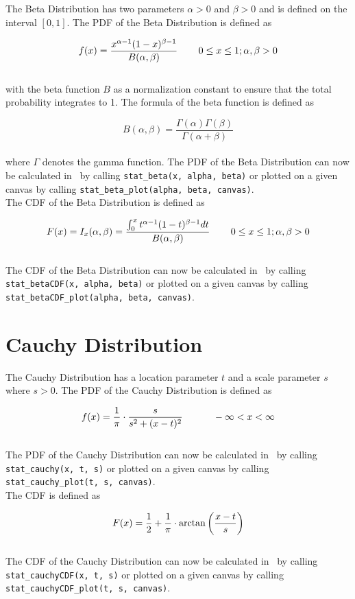 		The Beta Distribution has two parameters $\alpha > 0$ and $\beta > 0$ and is defined on the interval $[0,1]$. The \ac{PDF} of the Beta Distribution is defined as

		$$f(x) = \frac{x^{\alpha-1}(1-x)^{\beta-1}}{B(\alpha,\beta)}  \hspace{.3in} 0 \le x \le 1; \alpha, \beta > 0$$
		\\[0.3cm]		
		with the beta function $B$ as a normalization constant to ensure that the total probability integrates to 1. The formula of the beta function is defined as

		$$B(\alpha,\beta) = \frac{\Gamma(\alpha)\Gamma(\beta)}{\Gamma(\alpha + \beta)}$$
		\\[0.3cm]
		where $\Gamma$ denotes the gamma function. The \ac{PDF} of the Beta Distribution can now be calculated in \setlx\ by calling \lstinline{stat_beta(x, alpha, beta)} or plotted on a given canvas by calling \lstinline{stat_beta_plot(alpha, beta, canvas)}.
		\\[0.3cm]		
		The \ac{CDF} of the Beta Distribution is defined as

		$$F(x) = I_{x}(\alpha,\beta) = \frac{\int_{0}^{x}{t^{\alpha-1}(1-t)^{\beta-1}dt}}{B(\alpha,\beta)} \hspace{.3in} 0 \le x \le 1; \alpha, \beta > 0$$
		\\[0.3cm]
		The \ac{CDF} of the Beta Distribution can now be calculated in \setlx\ by calling \lstinline{stat_betaCDF(x, alpha, beta)} or plotted on a given canvas by calling \lstinline{stat_betaCDF_plot(alpha, beta, canvas)}.


	\section{Cauchy Distribution}

		The Cauchy Distribution has a location parameter $t$ and a scale parameter $s$ where $s > 0$. The \ac{PDF} of the Cauchy Distribution is defined as

		$$\displaystyle f(x) = \frac{1}{\pi} \cdot \frac{s}{s^2 + (x-t)^2} \quad \hspace{.3in} -\infty<x<\infty$$
		\\[0.3cm]
		The \ac{PDF} of the Cauchy Distribution can now be calculated in \setlx\ by calling \lstinline{stat_cauchy(x, t, s)} or plotted on a given canvas by calling \lstinline{stat_cauchy_plot(t, s, canvas)}.
		\\[0.3cm]
		The \ac{CDF} is defined as 

		$$\displaystyle F(x) = \frac{1}{2} + \frac{1}{\pi} \cdot \arctan\left(\frac{x-t}{s}\right)$$
		\\[0.3cm]
		The \ac{CDF} of the Cauchy Distribution can now be calculated in \setlx\ by calling \lstinline{stat_cauchyCDF(x, t, s)} or plotted on a given canvas by calling \lstinline{stat_cauchyCDF_plot(t, s, canvas)}.

